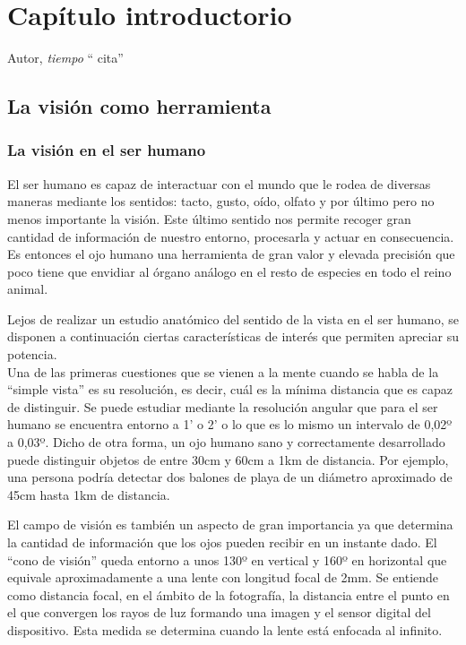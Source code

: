 \chapter{ Capítulo introductorio}

\begin{chapquote}{Autor, \textit{tiempo}}
`` cita''
\end{chapquote}

\section{La visión como herramienta}
\subsection{La visión en el ser humano}
El ser humano es capaz de interactuar con el mundo que le rodea de diversas maneras mediante los sentidos: tacto, gusto, oído, olfato y por último pero no menos importante la visión. Este último sentido nos permite recoger gran cantidad de información de nuestro entorno, procesarla y actuar en consecuencia. Es entonces el ojo humano una herramienta de gran valor y elevada precisión que poco tiene que envidiar al órgano análogo en el resto de especies en todo el reino animal. 

Lejos de realizar un estudio anatómico del sentido de la vista en el ser humano, se disponen a continuación ciertas características de interés que permiten apreciar su potencia.
\\
Una de las primeras cuestiones que se vienen a la mente cuando se habla de la ``simple vista'' es su resolución, es decir, cuál es la mínima distancia que es capaz de distinguir. Se puede estudiar mediante la resolución angular que para el ser humano se encuentra entorno a 1' o 2' o lo que es lo mismo un intervalo de 0,02º a 0,03º\cite{simple_vista}. Dicho de otra forma, un ojo humano sano y correctamente desarrollado puede distinguir objetos de entre 30cm y 60cm a 1km de distancia. Por ejemplo, una persona podría detectar dos balones de playa de un diámetro aproximado de 45cm hasta 1km de distancia.


El campo de visión es también un aspecto de gran importancia ya que determina la cantidad de información que los ojos pueden recibir en un instante dado. El ``cono de visión'' queda entorno a unos 130º en vertical y 160º en horizontal que equivale aproximadamente a una lente con longitud focal de 2mm\cite{angle_of_view}. Se entiende como distancia focal, en el ámbito de la fotografía, la distancia entre el punto en el que convergen los rayos de luz formando una imagen y el sensor digital del dispositivo. Esta medida se determina cuando la lente está enfocada al infinito.

